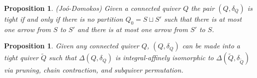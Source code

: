 \documentclass[11pt]{amsart}
\theoremstyle{plain}
\newtheorem{proposition}[theorem]{Proposition}
\theoremstyle{definition}
\begin{document}

\begin{proposition}\label{canonical-contraction-condition}
    (Joó-Domokos) Given a connected quiver $Q$ the pair $(Q, \delta_Q)$ is tight if and only if there is no partition $Q_0 = S \sqcup S'$ such that there is at most one arrow from $S$ to $S'$ and there is at most one arrow from $S'$ to $S$.
\end{proposition}

\begin{proposition}
    Given any connected quiver $Q$, $(Q, \delta_Q)$ can be made into a tight quiver $\widetilde{Q}$ such that $\Delta(Q, \delta_Q)$ is integral-affinely isomorphic to $\Delta(\widetilde{Q}, \delta_{\widetilde{Q}})$ via pruning, chain contraction, and subquiver permutation.
\end{proposition}
\end{document}
